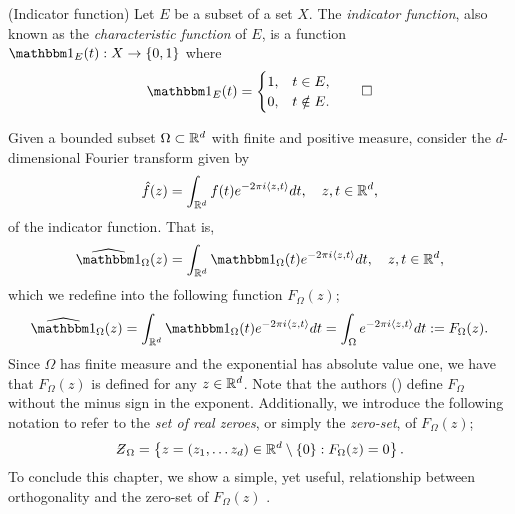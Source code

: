 \documentclass[../thesis.tex]{subfiles}
\begin{document}
\begin{definition}(Indicator function)\label{def:indicator}
    Let $E$ be a subset of a set $X$. The \emph{indicator function}, also known as the \emph{characteristic function} of $E$, is a function $\indicator{E}{t}: X \rightarrow \braq{0,1}$ where
    \begin{equation*}
        \indicator{E}{t}  = 
        \begin{cases} 
            1, &  t\in E,\\
            0, &  t \notin E.
        \end{cases}
        \qedhere
    \end{equation*}
\end{definition}

Given a bounded subset $\Omega\subset \mathbb{R}^d$ with finite and positive measure, consider the $d$-dimensional Fourier transform given by
\begin{equation*}
    \hat{f}(z) = \int_{\mathbb{R}^d} f(t)  e^{-2\pi i \langle z,t\rangle} dt, \quad z,t\in \mathbb{R}^d,
\end{equation*}
of the indicator function. That is, 
\begin{equation*}
    \indicatorFourier{\Omega}{z} = \int_{\R^d} \indicator{\Omega}{t}  e^{-2\pi i \braa{z,t}} dt, \quad z,t\in \R^d,
\end{equation*} 
which we redefine into the following function $F_{\Omega}(z)$;
\begin{equation}\label{eq:f_omega}
    \indicatorFourier{\Omega}{z} = \int_{\R^d} \indicator{\Omega}{t}  e^{-2\pi i \braa{z,t}} dt = \int_{\Omega} e^{-2\pi i \braa{z,t}} dt := F_{\Omega}(z).
\end{equation}
Since $\Omega$ has finite measure and the exponential has absolute value one, we have that $F_{\Omega}(z)$ is defined for any $z \in \mathbb{R}^d$. Note that the authors (\cite{jorgensenSpectralPairsCartesian2001}) define $F_{\Omega}$ without the minus sign in the exponent. Additionally, we introduce the following notation to refer to the \emph{set of real zeroes}, or simply the \emph{zero-set}, of $F_{\Omega}(z)$;
\begin{equation*}
    \Zstroke_{\Omega} = \braqMed{ z  = (z_1, \dots z_d) \in \R^d \setminus \braqMed{0} : F_{\Omega}(z)= 0}.
\end{equation*}
To conclude this chapter, we show a simple, yet useful, relationship between orthogonality and the zero-set of $F_{\Omega}(z)$ \cite{lagariasOrthonormalBasesExponentials2000,jorgensenSpectralPairsCartesian2001}. %
\end{document}
